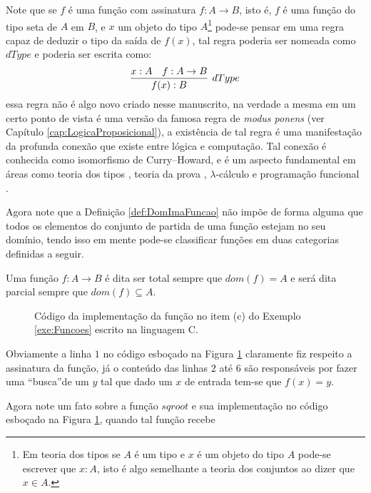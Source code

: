 Note que se $f$ é uma função com assinatura $f: A \rightarrow B$, isto é, $f$ é uma função do tipo seta de $A$ em $B$, e $x$ um objeto do tipo $A$\footnote{Em teoria dos tipos \cite{nederpelt2014, thompson1999} se $A$ é um tipo e $x$ é um objeto do tipo $A$ pode-se escrever que $x:A$, isto é algo semelhante a teoria dos conjuntos ao dizer que $x \in A$.} pode-se pensar em uma regra capaz de deduzir o tipo da saída de $f(x)$, tal regra poderia ser nomeada como $dType$ e poderia ser escrita como:
\begin{equation*}
	\infer[dType]{f(x):B}{x:A & f:A \rightarrow B}
\end{equation*}
essa regra não é algo novo criado nesse manuscrito, na verdade a mesma em um certo ponto de vista é uma versão da famosa regra de \textit{modus ponens} (ver Capítulo \ref{cap:LogicaProposicional}), a existência de tal regra é uma manifestação da profunda conexão que existe entre lógica e computação. Tal conexão é conhecida como isomorfismo de Curry–Howard, e é um aspecto fundamental em áreas como teoria dos tipos \cite{nederpelt2014, thompson1999}, teoria da prova \cite{nederpelt2014, sergey2014}, $\lambda$-cálculo \cite{bare1984, henk1992, bimbo2019} e programação funcional \cite{thompson1999, fmcbook}.

Agora note que a Definição \ref{def:DomImaFuncao} não impõe de forma alguma que todos os elementos do conjunto de partida de uma função estejam no seu domínio, tendo isso em mente pode-se classificar funções em duas categorias definidas a seguir.

\begin{definition}
	Uma função $f: A \rightarrow B$ é dita ser total sempre que $dom(f) = A$ e será dita parcial sempre que $dom(f) \subseteq A$.
\end{definition}


\begin{figure}[h]
	
	\caption{Código da implementação da função no item (c) do Exemplo \ref{exe:Funcoes} escrito na linguagem C.}
	\label{fig:FuncaoSqrt}
\end{figure}

\begin{remark}
	Obviamente a linha $1$ no código esboçado na Figura \ref{fig:FuncaoSqrt} claramente fiz respeito a assinatura da função, já o conteúdo das linhas $2$ até $6$ são responsáveis por fazer uma ``busca''de um $y$ tal que dado um $x$ de entrada tem-se que $f(x) = y$.
\end{remark}

Agora note um fato sobre a função $sqroot$ e sua implementação no código esboçado na Figura \ref{fig:FuncaoSqrt}, quando tal função recebe 


